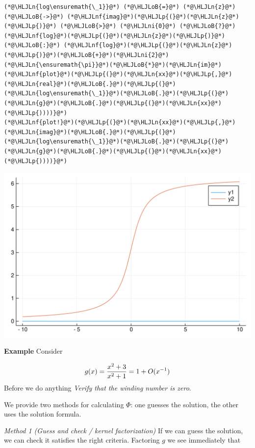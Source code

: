 \documentclass[12pt,a4paper]{article}
\newcommand{\HLJLn}[1]{#1}
\newcommand{\HLJLnf}[1]{\textcolor[RGB]{66,102,213}{#1}}
\newcommand{\HLJLni}[1]{\textcolor[RGB]{59,151,46}{#1}}
\newcommand{\HLJLoB}[1]{\textcolor[RGB]{102,102,102}{\textbf{#1}}}
\newcommand{\HLJLp}[1]{#1}
\begin{document}
\begin{lstlisting}
(*@\HLJLn{log\ensuremath{\_1}}@*) (*@\HLJLoB{=}@*) (*@\HLJLn{z}@*) (*@\HLJLoB{->}@*) (*@\HLJLnf{imag}@*)(*@\HLJLp{(}@*)(*@\HLJLn{z}@*)(*@\HLJLp{)}@*) (*@\HLJLoB{>}@*) (*@\HLJLni{0}@*) (*@\HLJLoB{?}@*) (*@\HLJLnf{log}@*)(*@\HLJLp{(}@*)(*@\HLJLn{z}@*)(*@\HLJLp{)}@*) (*@\HLJLoB{:}@*) (*@\HLJLnf{log}@*)(*@\HLJLp{(}@*)(*@\HLJLn{z}@*)(*@\HLJLp{)}@*)(*@\HLJLoB{+}@*)(*@\HLJLni{2}@*)(*@\HLJLn{\ensuremath{\pi}}@*)(*@\HLJLoB{*}@*)(*@\HLJLn{im}@*)
(*@\HLJLnf{plot}@*)(*@\HLJLp{(}@*)(*@\HLJLn{xx}@*)(*@\HLJLp{,}@*) (*@\HLJLn{real}@*)(*@\HLJLoB{.}@*)(*@\HLJLp{(}@*)(*@\HLJLn{log\ensuremath{\_1}}@*)(*@\HLJLoB{.}@*)(*@\HLJLp{(}@*)(*@\HLJLn{g}@*)(*@\HLJLoB{.}@*)(*@\HLJLp{(}@*)(*@\HLJLn{xx}@*)(*@\HLJLp{))))}@*)
(*@\HLJLnf{plot!}@*)(*@\HLJLp{(}@*)(*@\HLJLn{xx}@*)(*@\HLJLp{,}@*) (*@\HLJLn{imag}@*)(*@\HLJLoB{.}@*)(*@\HLJLp{(}@*)(*@\HLJLn{log\ensuremath{\_1}}@*)(*@\HLJLoB{.}@*)(*@\HLJLp{(}@*)(*@\HLJLn{g}@*)(*@\HLJLoB{.}@*)(*@\HLJLp{(}@*)(*@\HLJLn{xx}@*)(*@\HLJLp{))))}@*)
\end{lstlisting}

\includegraphics[width=\linewidth]{figures/Lecture25_3_1.pdf}

\textbf{Example} Consider 

\[
g(x) = {x^2+3 \over x^2+1} = 1 + O(x^{-1})
\]
Before we do anything \emph{Verify that the winding number is zero}.

We provide two methods for calculating $\Phi$: one guesses the solution, the other uses the solution formula.

\emph{Method 1 (Guess and check / kernel factorization)} If we can guess the solution, we can check it satisfies the right criteria.   Factoring $g$ we see immediately that
\end{document}
